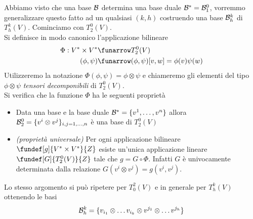 \begin{defn} 
	Abbiamo visto che una base $\mathcal{B}$ determina una base duale $\mathcal{B}^* = \mathcal{B}_1^0$, vorremmo generalizzare questo fatto ad un qualsiasi $(k,h)$ costruendo una base $\mathcal{B}_h^k$ di $T_h^k(V)$. Cominciamo con $T_2^0(V)$. \\
Si definisce in modo canonico l'applicazione bilineare
\begin{align*}
	\Phi : V^* \times V^*  &\funarrow T_2^0(V) \\
			   (\phi,\psi) &\funarrow (\phi,\psi)[v,w] = \phi(v)\psi(w)
\end{align*}
Utilizzeremo la notazione $\Phi(\phi,\psi) = \phi \otimes \psi$ e chiameremo gli elementi del tipo $\phi \otimes \psi$ \emph{tensori decomponibili} di $T_2^0(V)$. \\
Si verifica che la funzione $\Phi$ ha le seguenti proprietà
\begin{itemize}
\item Data una base e la base duale $\mathcal{B}^* = \{ v^1, \dots, v^n \}$ allora $\mathcal{B}_2^0 = \{ v^i \otimes v^j \}_{i,j = 1, \dots, n}$ è una base di $T_2^0(V)$
\item \emph{(proprietà universale)} Per ogni applicazione bilineare $\fundef[g]{V^* \times V^*}{Z}$ esiste un'unica applicazione lineare $\fundef[G]{T_2^0(V)}{Z}$ tale che $g = G \circ \Phi$. Infatti $G$ è univocamente determinata dalla relazione $G(v^i \otimes v^j) = g(v^i,v^j)$.
\end{itemize}
Lo stesso argomento si può ripetere per $T_0^2(V)$ e in generale per $T_h^k(V)$ ottenendo le basi $$ \mathcal{B}_h^k = \{ v_{i_1} \otimes \dots v_{i_k} \otimes v^{j_1} \otimes \dots v^{j_h} \} $$
\end{defn}